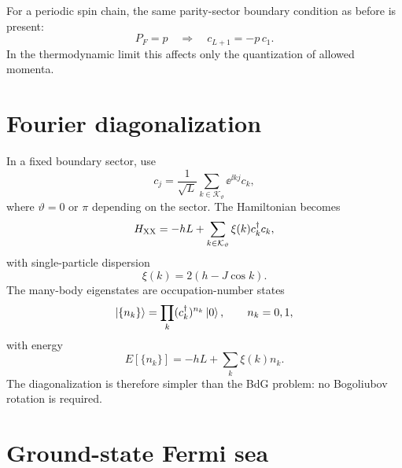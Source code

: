 For a periodic spin chain, the same parity-sector boundary condition as before
is present:
\begin{equation}
\label{eq:xx-parity-boundary-condition}
    P_F=p
    \quad\Longrightarrow\quad
    c_{L+1}=-p\,c_1.
\end{equation}
In the thermodynamic limit this affects only the quantization of allowed momenta.

\section{Fourier diagonalization}
\label{sec:xx-fourier-diagonalization}

In a fixed boundary sector, use
\begin{equation}
    c_j=\frac{1}{\sqrt{L}}\sum_{k\in\mathcal{K}_\vartheta}
    \ee^{\ii kj}c_k,
\end{equation}
where $\vartheta=0$ or $\pi$ depending on the sector.  The Hamiltonian becomes
\begin{equation}
\label{eq:xx-momentum-hamiltonian}
    H_{\rm XX}
    =
    -hL+
    \sum_{k\in\mathcal{K}_\vartheta}
    \xi(k)c_k^\dagger c_k,
\end{equation}
with single-particle dispersion
\begin{equation}
\label{eq:xx-dispersion}
    \xi(k)=2(h-J\cos k).
\end{equation}
The many-body eigenstates are occupation-number states
\begin{equation}
\label{eq:xx-occupation-basis}
    \left|\{n_k\}\right\rangle
    =
    \prod_{k}(c_k^\dagger)^{n_k}\left|0\right\rangle,
    \qquad
    n_k=0,1,
\end{equation}
with energy
\begin{equation}
\label{eq:xx-many-body-energy}
    E[\{n_k\}]
    =
    -hL+
    \sum_k \xi(k)n_k.
\end{equation}
The diagonalization is therefore simpler than the BdG problem: no Bogoliubov
rotation is required.

\section{Ground-state Fermi sea}
\label{sec:xx-ground-state-fermi-sea}

